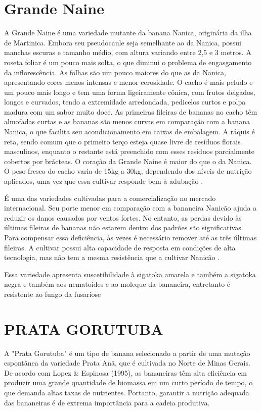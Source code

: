 \section{Grande Naine}
A Grande Naine é uma variedade mutante da banana Nanica, originária da ilha de Martinica. Embora seu pseudocaule seja semelhante ao da Nanica, possui manchas escuras e tamanho médio, com altura variando entre 2,5 e 3 metros. A roseta foliar é um pouco mais solta, o que diminui o problema de engasgamento da inflorescência. As folhas são um pouco maiores do que as da Nanica, apresentando cores menos intensas e menor cerosidade. O cacho é mais peludo e um pouco mais longo e tem uma forma ligeiramente cônica, com frutos delgados, longos e curvados, tendo a extremidade arredondada, pedicelos curtos e polpa madura com um sabor muito doce. As primeiras fileiras de bananas no cacho têm almofadas curtas e as bananas são menos curvas em comparação com a banana Nanica, o que facilita seu acondicionamento em caixas de embalagem. A ráquis é reta, sendo comum que o primeiro terço esteja quase livre de resíduos florais masculinos, enquanto o restante está preenchido com esses resíduos parcialmente cobertos por brácteas. O coração da Grande Naine é maior do que o da Nanica. O peso fresco do cacho varia de 15kg a 30kg, dependendo dos níveis de nutrição aplicados, uma vez que essa cultivar responde bem à adubação \cite{cultivodebananeira}.

É uma das variedades cultivadas para a comercialização no mercado internacional. Seu porte menor em comparação com a bananeira Nanicão ajuda a reduzir os danos causados por ventos fortes. No entanto, as perdas devido às últimas fileiras de bananas não estarem dentro dos padrões são significativas. Para compensar essa deficiência, às vezes é necessário remover até as três últimas fileiras. A cultivar possui alta capacidade de resposta em condições de alta tecnologia, mas não tem a mesma resistência que a cultivar Nanicão \cite{cultivodebananeira}.

Essa variedade apresenta suscetibilidade à sigatoka amarela \cite {rocha2008epidemiologia, cultivodebananeira} e também a sigatoka negra e também aos nematoides e ao moleque-da-bananeira, entretanto é resistente ao fungo da fusariose \cite{cultivodebananeira}

\section{PRATA GORUTUBA}
A "Prata Gorutuba" é um tipo de banana selecionado a partir de uma mutação espontânea da variedade Prata Anã, que é cultivada no Norte de Minas Gerais. De acordo com Lopez \& Espinosa (1995), as bananeiras têm alta eficiência em produzir uma grande quantidade de biomassa em um curto período de tempo, o que demanda altas taxas de nutrientes. Portanto, garantir a nutrição adequada das bananeiras é de extrema importância para a cadeia produtiva.

